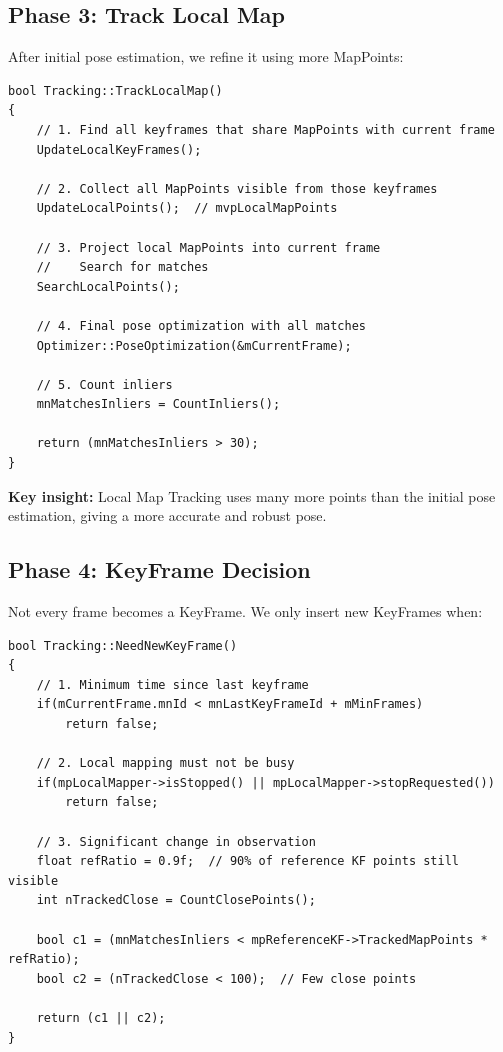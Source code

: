 \subsection{Phase 3: Track Local Map}

After initial pose estimation, we refine it using more MapPoints:

\begin{lstlisting}[caption={TrackLocalMap concept}]
bool Tracking::TrackLocalMap()
{
    // 1. Find all keyframes that share MapPoints with current frame
    UpdateLocalKeyFrames();
    
    // 2. Collect all MapPoints visible from those keyframes
    UpdateLocalPoints();  // mvpLocalMapPoints
    
    // 3. Project local MapPoints into current frame
    //    Search for matches
    SearchLocalPoints();
    
    // 4. Final pose optimization with all matches
    Optimizer::PoseOptimization(&mCurrentFrame);
    
    // 5. Count inliers
    mnMatchesInliers = CountInliers();
    
    return (mnMatchesInliers > 30);
}
\end{lstlisting}

\textbf{Key insight:} Local Map Tracking uses many more points than the initial pose estimation, giving a more accurate and robust pose.

\subsection{Phase 4: KeyFrame Decision}

Not every frame becomes a KeyFrame. We only insert new KeyFrames when:

\begin{lstlisting}[caption={NeedNewKeyFrame simplified}]
bool Tracking::NeedNewKeyFrame()
{
    // 1. Minimum time since last keyframe
    if(mCurrentFrame.mnId < mnLastKeyFrameId + mMinFrames)
        return false;
    
    // 2. Local mapping must not be busy
    if(mpLocalMapper->isStopped() || mpLocalMapper->stopRequested())
        return false;
    
    // 3. Significant change in observation
    float refRatio = 0.9f;  // 90% of reference KF points still visible
    int nTrackedClose = CountClosePoints();
    
    bool c1 = (mnMatchesInliers < mpReferenceKF->TrackedMapPoints * refRatio);
    bool c2 = (nTrackedClose < 100);  // Few close points
    
    return (c1 || c2);
}
\end{lstlisting}

